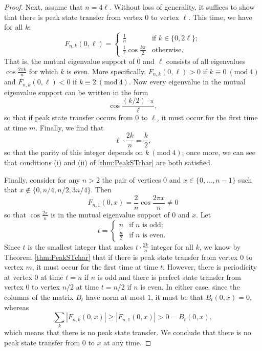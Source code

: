 \documentclass{article}
\numberwithin{equation}{section}
\newcommand{\slimmod}[1]{\ (\mathrm{mod}\ #1)}
\begin{document}
\begin{proof}
Next, assume that $n = 4\ell$. Without loss of generality, it suffices to show that there is peak state transfer from vertex $0$ to vertex $\ell$. This time, we have for all $k$:
\begin{equation}
\label{eq:peakST_cycle_n=4l_entries}
F_{n,k}(0,\ell) = \begin{cases}
\frac{1}{n} &\text{if $k\in \{0,2\ell\}$};\\
\frac{1}{\ell}\cos \frac{k\pi}{2} &\text{otherwise.}
\end{cases}
\end{equation}
That is, the mutual eigenvalue support of $0$ and $\ell$ consists of all eigenvalues $\cos\frac{2\pi k}{n}$ for which $k$ is even. More specifically, $F_{n,k}(0,\ell) > 0$ if $k \equiv 0 \slimmod 4$ and $F_{n,k}(0,\ell) < 0$ if $k \equiv 2 \slimmod 4$. Now every eigenvalue in the mutual eigenvalue support can be written in the form
\[
\cos\frac{(k/2)\cdot \pi}{\ell},
\]
so that if peak state transfer occurs from $0$ to $\ell$, it must occur for the first time at time $m$. Finally, we find that
\[
\ell \cdot \frac{2k}{n} = \frac{k}{2},
\]
so that the parity of this integer depends on $k \slimmod 4$; once more, we can see that conditions (i) and (ii) of \ref{thm:PeakSTchar} are both satisfied.

Finally, consider for any $n > 2$ the pair of vertices $0$ and $x \in \{0,\ldots,n-1\}$ such that $x \notin \{0,n/4,n/2,3n/4\}$. Then
\[
F_{n,1}(0,x) = \frac{2}{n}\cos\frac{2\pi x}{n} \neq 0
\]
so that $\cos\frac{2\pi}{n}$ is in the mutual eigenvalue support of $0$ and $x$. Let
\[
t = \begin{cases}
n &\text{if $n$ is odd;} \\
\frac{n}{2} &\text{if $n$ is even.}
\end{cases}
\]
Since $t$ is the smallest integer that makes $t \cdot \frac{2 k}{n}$ integer for all $k$, we know by Theorem \ref{thm:PeakSTchar} that if there is peak state transfer from vertex $0$ to vertex $m$, it must occur for the first time at time $t$. However, there is periodicity at vertex $0$ at time $t = n$ if $n$ is odd and there is perfect state transfer from vertex $0$ to vertex $n/2$ at time $t = n/2$ if $n$ is even. In either case, since the columns of the matrix $B_t$ have norm at most $1$, it must be that $B_t(0,x) = 0$, whereas
\[
\sum_{k} |F_{n,k}(0,x)| \geq |F_{n,1}(0,x)| > 0 = B_t(0,x),
\]
which means that there is no peak state transfer. We conclude that there is no peak state transfer from $0$ to $x$ at any time.
\end{proof}
\end{document}

